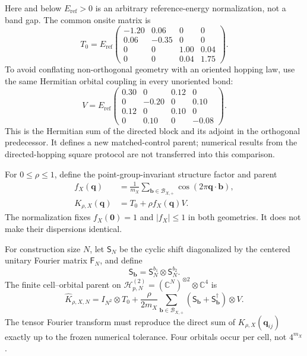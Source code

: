 \documentclass[11pt]{article}
\begin{document}
Here and below $E_{\mathrm{ref}}>0$ is an arbitrary reference-energy normalization, not
a band gap. The common onsite matrix is
\begin{equation}
 T_0=E_{\mathrm{ref}}
 \begin{pmatrix}
 -1.20&0.06&0&0\\
 0.06&-0.35&0&0\\
 0&0&1.00&0.04\\
 0&0&0.04&1.75
 \end{pmatrix}.
\end{equation}
To avoid conflating non-orthogonal geometry with an oriented hopping law, use the same
Hermitian orbital coupling in every unoriented bond:
\begin{equation}
 V=E_{\mathrm{ref}}
 \begin{pmatrix}
 0.30&0&0.12&0\\
 0&-0.20&0&0.10\\
 0.12&0&0.10&0\\
 0&0.10&0&-0.08
 \end{pmatrix}.
 \label{eq:orbital-coupling}
\end{equation}
This is the Hermitian sum of the directed block and its adjoint in the orthogonal
predecessor.  It defines a new matched-control parent; numerical results from the
directed-hopping square protocol are not transferred into this comparison.

For $0\le\rho\le1$, define the point-group-invariant structure factor and parent
\begin{align}
 f_X(\mathbf q)
 &=\frac1{m_X}\sum_{\mathbf b\in\mathcal B_{X,+}}
   \cos(2\pi\mathbf q\cdot\mathbf b),\\
 K_{\rho,X}(\mathbf q)&=T_0+\rho f_X(\mathbf q)V.
 \label{eq:parent}
\end{align}
The normalization fixes $f_X(\mathbf0)=1$ and $|f_X|\le1$ in both geometries.  It does
not make their dispersions identical.

For construction size $N$, let $\mathsf S_N$ be the cyclic shift diagonalized by the
centered unitary Fourier matrix $\mathsf F_N$, and define
\begin{equation}
 \mathsf S_{\mathbf b}=\mathsf S_N^{b_1}\otimes\mathsf S_N^{b_2}.
\end{equation}
The finite cell--orbital parent on
$\mathcal H_{p,N}^{(2)}=(\mathbb C^N)^{\otimes2}\otimes\mathbb C^4$ is
\begin{equation}
 \widehat K_{\rho,X,N}
 =I_{N^2}\otimes T_0
 +\frac{\rho}{2m_X}\sum_{\mathbf b\in\mathcal B_{X,+}}
  (\mathsf S_{\mathbf b}+\mathsf S_{\mathbf b}^{\dagger})\otimes V.
 \label{eq:finite-parent}
\end{equation}
The tensor Fourier transform must reproduce the direct sum of
$K_{\rho,X}(\mathbf q_{ij})$ exactly up to the frozen numerical tolerance.  Four
orbitals occur per cell, not $4^{m_X}$.
\end{document}
